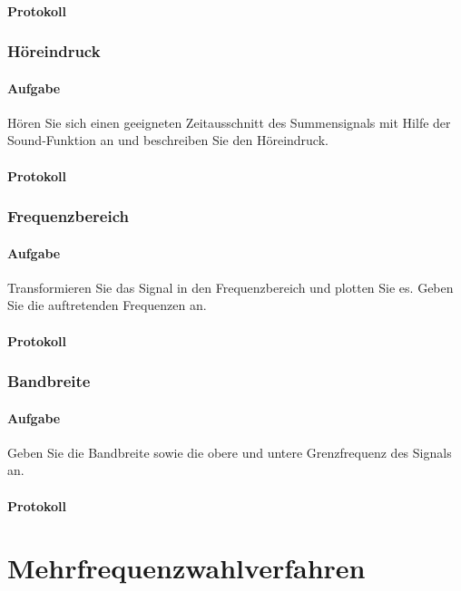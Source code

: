 \documentclass[10pt]{report}
\begin{document}
        \paragraph{Protokoll}

        \subsubsection{Höreindruck}
        \paragraph{Aufgabe}
        Hören Sie sich einen geeigneten Zeitausschnitt des Summensignals mit Hilfe der
        \glqq{}Sound\grqq{}-Funktion an und beschreiben Sie den Höreindruck.
        \paragraph{Protokoll}

        \subsubsection{Frequenzbereich}
        \paragraph{Aufgabe}
        Transformieren Sie das Signal in den Frequenzbereich und plotten Sie es. Geben Sie
        die auftretenden Frequenzen an.
        \paragraph{Protokoll}

        \subsubsection{Bandbreite}
        \paragraph{Aufgabe}
        Geben Sie die Bandbreite sowie die obere und untere Grenzfrequenz des Signals an.
        \paragraph{Protokoll}

        \section{Mehrfrequenzwahlverfahren}
\end{document}
